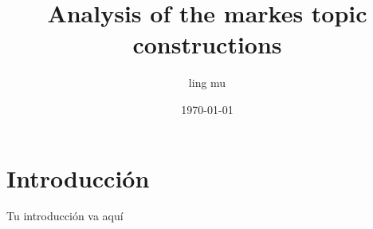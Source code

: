 \documentclass{article}
\title{Analysis of the markes topic constructions}
\author{ling mu}
\date{\today}
\begin{document}
\maketitle

\section{Introducción}

Tu introducción va aquí
\end{document}
